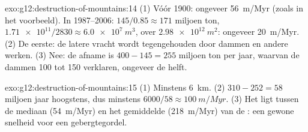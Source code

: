 \begin{solution}{exo:g12:destruction-of-mountains:14}
(1) Vóór 1900: ongeveer \qty{56}{m/Myr} (zoals in het voorbeeld). In
1987--2006: $145/0.85 \approx 171$ miljoen ton, $\num{1.71e11}/2830
\approx \qty{6.0e7}{m^3}$, over $\qty{2.98e12}{m^2}$: ongeveer
\qty{20}{m/Myr}. (2) De eerste: de latere vracht wordt tegengehouden door dammen
en andere werken. (3) Nee: de afname is $400 - 145 = 255$ miljoen ton per
jaar, waarvan de dammen 100 tot 150 verklaren, ongeveer de helft.
\end{solution}

\begin{solution}{exo:g12:destruction-of-mountains:15}
(1) Minstens \qty{6}{km}. (2) $310 - 252 = 58$ miljoen jaar hoogstens, dus
minstens $6000/58 \approx \qty{100}{m/Myr}$. (3) Het ligt tussen de mediaan
(\qty{54}{m/Myr}) en het gemiddelde (\qty{218}{m/Myr}) van de : een gewone
snelheid voor een gebergtegordel.
\end{solution}

